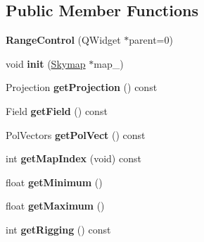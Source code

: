 \subsection*{Public Member Functions}
\begin{DoxyCompactItemize}
\item 
\hypertarget{classRangeControl_a57b7ab2574b96fac51c1227204c4a8eb}{
{\bfseries RangeControl} (QWidget $\ast$parent=0)}
\label{classRangeControl_a57b7ab2574b96fac51c1227204c4a8eb}

\item 
\hypertarget{classRangeControl_a40d371c650f325017a66d0c670357f11}{
void {\bfseries init} (\hyperlink{classSkymap}{Skymap} $\ast$map\_\-)}
\label{classRangeControl_a40d371c650f325017a66d0c670357f11}

\item 
\hypertarget{classRangeControl_a58ae0f44d99dc089e1a54c7005e87f8b}{
Projection {\bfseries getProjection} () const }
\label{classRangeControl_a58ae0f44d99dc089e1a54c7005e87f8b}

\item 
\hypertarget{classRangeControl_aa673f787d25e144fa51766b2a28e493a}{
Field {\bfseries getField} () const }
\label{classRangeControl_aa673f787d25e144fa51766b2a28e493a}

\item 
\hypertarget{classRangeControl_a03a0397465e7147efe25b64ed7a0de09}{
PolVectors {\bfseries getPolVect} () const }
\label{classRangeControl_a03a0397465e7147efe25b64ed7a0de09}

\item 
\hypertarget{classRangeControl_a212c84ccc56efb71d3e97398e8a5de24}{
int {\bfseries getMapIndex} (void) const }
\label{classRangeControl_a212c84ccc56efb71d3e97398e8a5de24}

\item 
\hypertarget{classRangeControl_abd066f437192310b0492a7bbca45ebbb}{
float {\bfseries getMinimum} ()}
\label{classRangeControl_abd066f437192310b0492a7bbca45ebbb}

\item 
\hypertarget{classRangeControl_a353e1f1796652a91c9c3cb828ff0270f}{
float {\bfseries getMaximum} ()}
\label{classRangeControl_a353e1f1796652a91c9c3cb828ff0270f}

\item 
\hypertarget{classRangeControl_ac9a2963bc397d37e7cfb3bec7097c10b}{
int {\bfseries getRigging} () const }
\label{classRangeControl_ac9a2963bc397d37e7cfb3bec7097c10b}


\end{DoxyCompactItemize}
